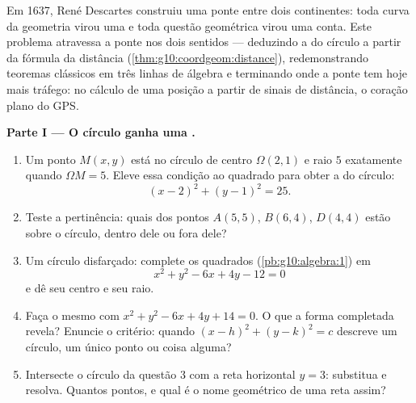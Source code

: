 \begin{problem}
\label{pb:g10:coordgeom:1}
Em 1637, René Descartes construiu uma ponte entre dois
continentes: toda curva da geometria virou uma \emph{} e
toda questão geométrica virou uma conta. Este problema atravessa
a ponte nos dois sentidos --- deduzindo a  do círculo a
partir da fórmula da distância
(\cref{thm:g10:coordgeom:distance}), redemonstrando teoremas
clássicos em três linhas de álgebra e terminando onde a ponte tem
hoje mais tráfego: no cálculo de uma posição a partir de sinais
de distância, o coração plano do GPS.

\medskip
\noindent\textbf{Parte I --- O círculo ganha uma .}
\begin{enumerate}
  \item Um ponto $M(x, y)$ está no círculo de centro
        $\Omega(2, 1)$ e raio $5$ exatamente quando
        $\Omega M = 5$. Eleve essa condição ao quadrado para
        obter a  do círculo:
        \[
        (x - 2)^2 + (y - 1)^2 = 25 .
        \]
  \item Teste a pertinência: quais dos pontos $A(5, 5)$,
        $B(6, 4)$, $D(4, 4)$ estão sobre o círculo, dentro dele
        ou fora dele?
  \item Um círculo disfarçado: complete os quadrados
        (\cref{pb:g10:algebra:1}) em
        \[
        x^2 + y^2 - 6x + 4y - 12 = 0
        \]
        e dê seu centro e seu raio.
  \item Faça o mesmo com $x^2 + y^2 - 6x + 4y + 14 = 0$. O que a
        forma completada revela? Enuncie o critério: quando
        $(x - h)^2 + (y - k)^2 = c$ descreve um círculo, um único
        ponto ou coisa alguma?
  \item Intersecte o círculo da questão 3 com a reta horizontal
        $y = 3$: substitua e resolva. Quantos pontos, e qual é o
        nome geométrico de uma reta assim?
\end{enumerate}


\end{problem}
